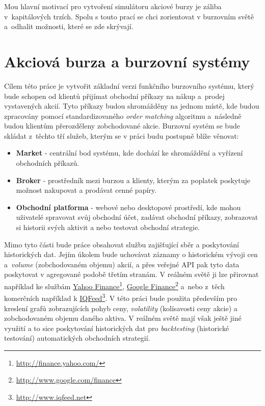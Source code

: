 \documentclass[thesis=M,czech]{FITthesis}[2012/06/26]
\newcommand\fnurl[2]{\href{#2}{#1}\footnote{\url{#2}}}
\begin{document}
	Mou hlavní motivací pro vytvoření simulátoru akciové burzy je záliba v~kapitálových trzích. Spolu s touto prací se chci zorientovat v burzovním světě a~odhalit možnosti, které se zde skrývají.

\section{Akciová burza a burzovní systémy}

	Cílem této práce je vytvořit základní verzi funkčního burzovního systému, který bude schopen od klientů přijímat obchodní příkazy na nákup a~prodej vystavených akcií. Tyto příkazy budou shromážděny na jednom místě, kde budou zpracovány pomocí standardizovaného \textit{order matching} algoritmu a~následně budou klientům přerozděleny zobchodované akcie. 
	Burzovní systém se bude skládat z~těchto tří služeb, kterým se v práci budu postupně blíže věnovat:

\begin{itemize}

  \item \textbf{Market} - centrální bod systému, kde dochází ke shromáždění a vyřízení obchodních příkazů.
  
  \item \textbf{Broker} - prostředník mezi burzou a klienty, kterým za poplatek poskytuje možnost nakupovat a prodávat cenné papíry.
  
  \item \textbf{Obchodní platforma} - webové nebo desktopové prostředí, kde mohou uživatelé spravovat svůj obchodní účet, zadávat obchodní příkazy, zobrazovat si historii svých aktivit a nebo testovat obchodní strategie.

\end{itemize}

	Mimo tyto části bude práce obsahovat službu zajišťující sběr a poskytování historických dat. Jejím úkolem bude uchovávat záznamy o historickém vývoji cen a~\textit{volume} (zobchodovaném objemu) akcií, a přes veřejné API pak tyto data poskytovat v agregované podobě třetím stranám. V reálném světě ji lze přirovnat například ke službám \fnurl{Yahoo Finance}{http://finance.yahoo.com/}, \fnurl{Google Finance}{http://www.google.com/finance} a~nebo z~těch komerčních například k \fnurl{IQFeed}{http://www.iqfeed.net}. V této práci bude použita především pro kreslení grafů zobrazujících pohyb ceny, \textit{volatility} (kolísavosti ceny akcie) a zobchodovaném objemu daného aktiva. V reálném světě mají však ještě jiné využití a to sice poskytování historických dat pro \textit{backtesting} (historické testování) automatických obchodních strategií.
	
\end{document}
